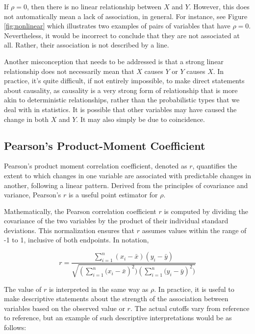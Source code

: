 \documentclass{article}
\begin{document}
If $\rho = 0$, then there is no linear relationship between $X$ and $Y$. However, this does not automatically mean a lack of association, in general. For instance, see Figure \ref{fig:nonlinear} which illustrates two examples of pairs of variables that have $\rho = 0$. Nevertheless, it would be incorrect to conclude that they are not associated at all. Rather, their association is not described by a line.

Another misconception that needs to be addressed is that a strong linear relationship does not necessarily mean that $X$ causes $Y$ or $Y$ causes $X$. In practice, it's quite difficult, if not entirely impossible, to make direct statements about causality, as causality is a very strong form of relationship that is more akin to deterministic relationships, rather than the probabilistic types that we deal with in statistics. It is possible that other variables may have caused the change in both $X$ and $Y$. It may also simply be due to coincidence.

\subsection{Pearson's Product-Moment Coefficient}

Pearson's product moment correlation coefficient, denoted as $r$, quantifies the extent to which changes in one variable are associated with predictable changes in another, following a linear pattern. Derived from the principles of covariance and variance, Pearson's $r$ is a useful point estimator for $\rho$.

Mathematically, the Pearson correlation coefficient $r$ is computed by dividing the covariance of the two variables by the product of their individual standard deviations. This normalization ensures that $r$ assumes values within the range of -1 to 1, inclusive of both endpoints. In notation,

$$
r = \frac{\sum^{n}_{i=1}{(x_i - \bar{x})(y_i - \bar{y})}}{\sqrt{(\sum^{n}_{i=1}{(x_i - \bar{x}})^2) (\sum^{n}_{i=1}{(y_i - \bar{y}})^2)}}
$$

The value of $r$ is interpreted in the same way as $\rho$. In practice, it is useful to make descriptive statements about the strength of the association between variables based on the observed value or $r$. The actual cutoffs vary from reference to reference, but an example of such descriptive interpretations would be as follows:
\end{document}
